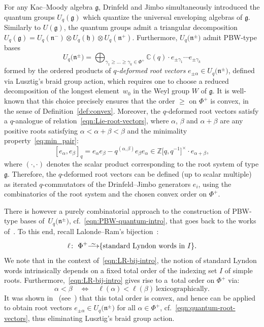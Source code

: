 \documentclass[10pt,a4paper]{amsart}
\numberwithin{equation}{section}
\newcommand{\fg}{\mathfrak{g}}
\newcommand{\fn}{\mathfrak{n}}
\newcommand{\fh}{\mathfrak{h}}
\newcommand{\BZ}{\mathbb{Z}}
\newcommand{\BC}{\mathbb{C}}
\newcommand\iso{ \vphantom{j^{X^2}}\smash{\overset{\sim}{\vphantom{\rule{0pt}{0.20em}}\smash{\longrightarrow}}} }
\begin{document}
For any Kac--Moody algebra $\fg$, Drinfeld and Jimbo simultaneously introduced the quantum groups $U_q(\fg)$ which quantize the universal enveloping algebras of $\fg$. Similarly to $U(\fg)$, the quantum groups admit a triangular decomposition $U_q(\fg) = U_q(\fn^-) \otimes U_q(\fh) \otimes U_q(\fn^+)$. Furthermore, $U_q\bigl(\fn^\pm\bigr)$ admit PBW-type bases
\begin{equation}\label{eqn:PBW-quantum-intro}
 U_q\bigl(\fn^\pm\bigr) =
 \bigoplus_{\gamma_1 \geq \dots \geq \gamma_k \in \Phi^+} \BC(q) \cdot e_{\pm \gamma_1} \cdots e_{\pm \gamma_k}
\end{equation}
formed by the ordered products of \textit{$q$-deformed root vectors} $e_{\pm \alpha} \in U_q\bigl(\fn^\pm\bigr)$, defined via Lusztig's braid group action, which requires one to choose a reduced decomposition of the longest element~$w_0$ in the Weyl group $W$ of $\fg$. It is well-known \cite{P} that this choice precisely ensures that the order $\geq$ on $\Phi^+$ is convex, in the sense of Definition~\ref{def:convex}. Moreover, the $q$-deformed root vectors satisfy a $q$-analogue of relation~\eqref{eqn:Lie-root-vectors}, where $\alpha$, $\beta$ and $\alpha+\beta$ are any positive roots satisfying $\alpha<\alpha+\beta<\beta$ and the minimality property~\eqref{eq:min_pair}:
\begin{equation}\label{eqn:quantum-root-vectors}
 [e_{\alpha} , e_{\beta}]_q = e_{\alpha} e_{\beta} - q^{(\alpha, \beta)} e_{\beta} e_{\alpha}
 \in \BZ\bigl[q,q^{-1}\bigr]^\times \cdot e_{\alpha+\beta},
\end{equation}
where $(\cdot, \cdot)$ denotes the scalar product corresponding to the root system of type $\fg$. Therefore, the $q$-deformed root vectors can be defined (up to scalar multiple) as iterated $q$-commutators of the Drinfeld--Jimbo generators $e_i$, using the combinatorics of the root system and the chosen convex order on $\Phi^+$.

There is however a purely combinatorial approach to the construction of PBW-type bases of~$U_q\bigl(\fn^\pm\bigr)$, cf.\ \eqref{eqn:PBW-quantum-intro}, that goes back to the works of~\cite{K1,K2,L,Ro}. To this end, recall Lalonde--Ram's bijection~\cite{LR}:
\begin{equation}\label{eqn:LR-bij-intro}
 \ell \colon\ \Phi^+ \iso \{\text{standard Lyndon words in}\ I\}.
\end{equation}
We note that in the context of~\eqref{eqn:LR-bij-intro}, the notion of standard Lyndon words intrinsically depends on a fixed total order of the indexing set $I$ of simple roots. Furthermore,~\eqref{eqn:LR-bij-intro} gives rise to a~total order on $\Phi^+$ via:
\begin{displaymath}
 \alpha < \beta \quad \Longleftrightarrow \quad \ell(\alpha) < \ell(\beta) \ \text{lexicographically}.
\end{displaymath}
It was shown in~\cite{Ro} (see~\cite[Proposition~26]{L}) that this total order is convex, and hence can be applied to obtain root vectors $e_{\pm \alpha} \in U_q\bigl(\fn^\pm\bigr)$ for all $\alpha\in \Phi^+$, cf.\ \eqref{eqn:quantum-root-vectors}, thus eliminating Lusztig's braid group action.
\end{document}
